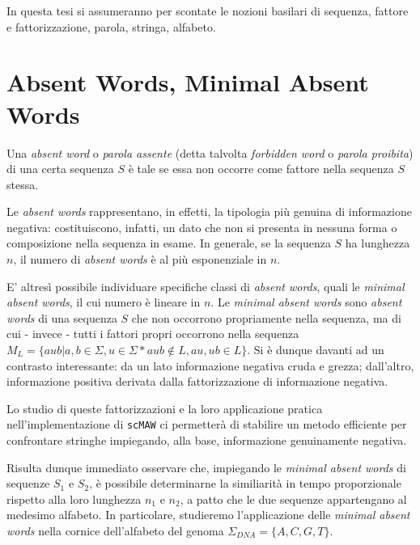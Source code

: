 In questa tesi si assumeranno per scontate le nozioni basilari di sequenza, fattore e fattorizzazione, parola, stringa, alfabeto.

\section{Absent Words, Minimal Absent Words}

Una \textit{absent word} o \textit{parola assente} (detta talvolta \textit{forbidden word} o \textit{parola proibita}) di una certa sequenza $S$ è tale se essa non occorre come fattore nella sequenza $S$ stessa. 

Le \textit{absent words} rappresentano, in effetti, la tipologia più genuina di informazione negativa: costituiscono, infatti, un dato che non si presenta in nessuna forma o composizione nella sequenza in esame. In generale, se la sequenza $S$ ha lunghezza $n$, il numero di \textit{absent words} è al più esponenziale in $n$. 

\vspace{3mm}

E' altresì possibile individuare specifiche classi di \textit{absent words}, quali le \textit{minimal absent words}, il cui numero è lineare in $n$. Le \textit{minimal absent words} sono \textit{absent words} di una sequenza $S$ che non occorrono propriamente nella sequenza, ma di cui - invece - tutti i fattori propri occorrono nella sequenza 
\(M_L = \{aub | a,b \in \Sigma, u\in \Sigma* aub\not\in L, au,ub\in L\} \). Si è dunque davanti ad un contrasto interessante: da un lato informazione negativa cruda e grezza; dall'altro, informazione positiva derivata dalla fattorizzazione di informazione negativa. 

\vspace{3mm}

Lo studio di queste fattorizzazioni e la loro applicazione pratica nell'implementazione di \verb|scMAW| ci permetterà di stabilire un metodo efficiente per confrontare stringhe impiegando, alla base, informazione genuinamente negativa.

\vspace{3mm}

Risulta dunque immediato osservare che, impiegando le \textit{minimal absent words} di sequenze $S_1$ e $S_2$, è possibile determinarne la similiarità in tempo proporzionale rispetto alla loro lunghezza $n_1$ e $n_2$, a patto che le due sequenze appartengano al medesimo alfabeto. In particolare, studieremo l'applicazione delle\textit{ minimal absent words} nella cornice dell'alfabeto del genoma $\Sigma_{DNA} =\{A, C, G, T\}$.

